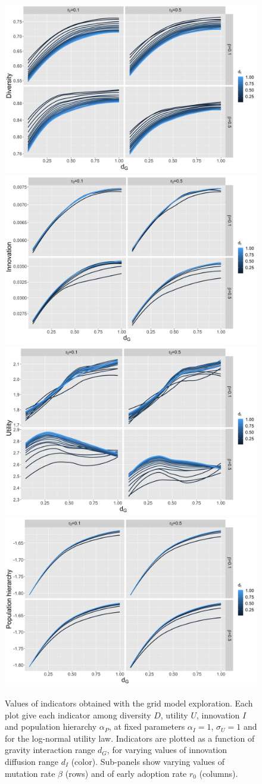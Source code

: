 \documentclass[letterpaper]{article}
\begin{document}
\begin{figure}[t]
	\centering
	\includegraphics[width=0.49\linewidth]{figures/averageDiversity-gravityDecay_color-innovationDecay_facet-mutationRate-earlyAdoptersRate_newInnovationHierarchy1_utilityStd1_distriblog-normal}
	\includegraphics[width=0.49\linewidth]{figures/averageInnovation-gravityDecay_color-innovationDecay_facet-mutationRate-earlyAdoptersRate_newInnovationHierarchy1_utilityStd1_distriblog-normal.png}
	\includegraphics[width=0.49\linewidth]{figures/averageUtility-gravityDecay_color-innovationDecay_facet-mutationRate-earlyAdoptersRate_newInnovationHierarchy1_utilityStd1_distriblog-normal.png}
	\includegraphics[width=0.49\linewidth]{figures/finalHierarchy-gravityDecay_color-innovationDecay_facet-mutationRate-earlyAdoptersRate_newInnovationHierarchy1_utilityStd1_distriblog-normal.png}
	\caption{Values of indicators obtained with the grid model exploration. Each plot give each indicator among diversity $D$, utility $U$, innovation $I$ and population hierarchy $\alpha_P$, at fixed parameters $\alpha_I = 1$, $\sigma_U = 1$ and for the log-normal utility law. Indicators are plotted as a function of gravity interaction range $d_G$, for varying values of innovation diffusion range $d_I$ (color). Sub-panels show varying values of mutation rate $\beta$ (rows) and of early adoption rate $r_0$ (columns).\label{fig:exploration}}
\end{figure}
\end{document}
